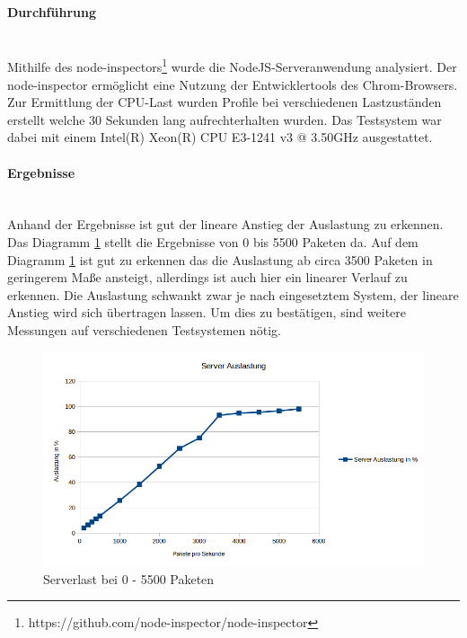 \documentclass[a4paper]{spie}  %
\begin{document}
\paragraph{Durchführung}\mbox{}\\
Mithilfe des node-inspectors\footnote{https://github.com/node-inspector/node-inspector} wurde die NodeJS-Serveranwendung analysiert. Der node-inspector ermöglicht eine Nutzung der Entwicklertools des Chrom-Browsers. Zur Ermittlung der CPU-Last wurden Profile bei verschiedenen Lastzuständen erstellt welche 30 Sekunden lang aufrechterhalten wurden. Das Testsystem war dabei mit einem Intel(R) Xeon(R) CPU E3-1241 v3 @ 3.50GHz ausgestattet.

\begin{minipage}[t]{0.4\textwidth}
	\vspace{0pt}
	\paragraph{Ergebnisse}\mbox{}\\
	Anhand der Ergebnisse ist gut der lineare Anstieg der Auslastung zu erkennen. Das Diagramm \ref{fig:ServerLast2} stellt die Ergebnisse von 0 bis 5500 Paketen da. Auf dem Diagramm \ref{fig:ServerLast2} ist gut zu erkennen das die Auslastung ab circa 3500 Paketen in geringerem Maße ansteigt, allerdings ist auch hier ein linearer Verlauf zu erkennen. Die Auslastung schwankt zwar je nach eingesetztem System, der lineare Anstieg wird sich übertragen lassen. Um dies zu bestätigen, sind weitere Messungen auf verschiedenen Testsystemen nötig.
\end{minipage}
\hfill
\begin{minipage}[t]{0.5\textwidth}
	\begin{figure}[H]	
	\vspace{0pt}
		\centering
		\includegraphics[width=1\textwidth]{./images/ServerLast3.png}
		\caption{Serverlast bei 0 - 5500 Paketen}
		\label{fig:ServerLast2}
	\end{figure}		
\end{minipage}
\end{document}
